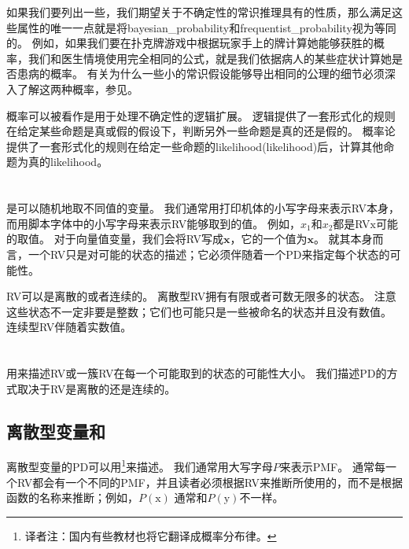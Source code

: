 如果我们要列出一些，我们期望关于不确定性的常识推理具有的性质，那么满足这些属性的唯一一点就是将\gls{bayesian_probability}和\gls{frequentist_probability}视为等同的。
例如，如果我们要在扑克牌游戏中根据玩家手上的牌计算她能够获胜的概率，我们和医生情境使用完全相同的公式，就是我们依据病人的某些症状计算她是否患病的概率。
有关为什么一些小的常识假设能够导出相同的公理的细节必须深入了解这两种概率，参见\cite{Ramsey1926}。


概率可以被看作是用于处理不确定性的逻辑扩展。
逻辑提供了一套形式化的规则在给定某些命题是真或假的假设下，判断另外一些命题是真的还是假的。
概率论提供了一套形式化的规则在给定一些命题的\gls{likelihood}(likelihood)后，计算其他命题为真的\gls{likelihood}。

\section{}
\label{sec:random_variables}

是可以随机地取不同值的变量。
我们通常用打印机体的小写字母来表示\gls{RV}本身，而用脚本字体中的小写字母来表示\gls{RV}能够取到的值。
例如，$x_1$和$x_2$都是\gls{RV}$\mathrm{x}$可能的取值。
对于向量值变量，我们会将\gls{RV}写成$\mathbf{x}$，它的一个值为$\bm{x}$。
就其本身而言，一个\gls{RV}只是对可能的状态的描述；它必须伴随着一个\gls{PD}来指定每个状态的可能性。

\gls{RV}可以是离散的或者连续的。
离散型\gls{RV}拥有有限或者可数无限多的状态。
注意这些状态不一定非要是整数；它们也可能只是一些被命名的状态并且没有数值。
连续型\gls{RV}伴随着实数值。

\section{}
\label{sec:probability_distributions}

用来描述\gls{RV}或一簇\gls{RV}在每一个可能取到的状态的可能性大小。
我们描述\gls{PD}的方式取决于\gls{RV}是离散的还是连续的。

\subsection{离散型变量和}
\label{sec:discrete_variables_and_probability_mass_functions}

离散型变量的\gls{PD}可以用\footnote{译者注：国内有些教材也将它翻译成概率分布律。}来描述。
我们通常用大写字母$P$来表示\gls{PMF}。
通常每一个\gls{RV}都会有一个不同的\gls{PMF}，并且读者必须根据\gls{RV}来推断所使用的，而不是根据函数的名称来推断；例如，$P(\mathrm{x})$ 通常和$P(\mathrm{y})$不一样。

